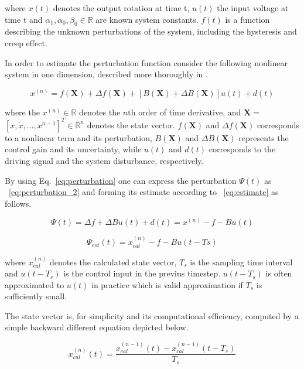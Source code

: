 where $x(t)$ denotes the output rotation at time t, $u(t)$ the input voltage at time t and $\alpha_1, \alpha_0, \beta_0 \in \mathbb{R}$ are known system constants. $f(t)$ is a function describing the unknown perturbations of the system, including the hysteresis and creep effect.

In order to estimate the perturbation function consider the following nonlinear system in one dimension, described more thoroughly in \cite{Elmali:1996}.

\begin{equation}
  \label{eq:perturbation}
  x^{(n)} = f(\mathbf{X}) + \Delta f(\mathbf{X}) + [B(\mathbf{X}) + \Delta B(\mathbf{X})]u(t) + d(t)
\end{equation}

where the $x^{(n)} \in \mathbb{R}$ denotes the $n$th order of time derivative, and $\mathbf{X} = $\\ $[x, \dot{x}, \hdots, x^{n-1}]^T\in \mathbb{R}^n$ denotes the state vector. $f(\mathbf{X})$ and $\Delta f(\mathbf{X})$ corresponds to a nonlinear term and its perturbation, $B(\mathbf{X})$ and $\Delta B(\mathbf{X})$
represents the control gain and its uncertainty, while $u(t)$ and $d(t)$ corresponds to the driving signal and the system disturbance, respectively.

By using Eq.~\eqref{eq:perturbation} one can express the perturbation $\Psi(t)$ as ~\eqref{eq:perturbation_2} and forming its estimate according to ~\eqref{eq:estimate} as follows.

\begin{equation}
  \label{eq:perturbation_2}
  \Psi(t) = \Delta f + \Delta Bu(t) + d(t) = x^{(n)} -f - Bu(t)
\end{equation}

\begin{equation}
  \label{eq:estimate}
  \Psi_{est}(t) = x_{cal}^{(n)} -f - Bu(t-Ts)
\end{equation}

where $x_{cal}^{(n)}$ denotes the calculated state vector, $T_s$ is the sampling time interval and $u(t-T_s)$ is the control input in the previus timestep. $u(t-T_s)$ is often approximated to $u(t)$ in practice which is valid approximation if $T_s$ is sufficiently small.

The state vector is, for simplicity and its computational efficiency, computed by a simple backward different equation depicted below.

\begin{equation}
  \label{eq:backward}
  x_{cal}^{(n)}(t) = \frac{x_{cal}^{(n-1)}(t) - x_{cal}^{(n-1)}(t-T_s)}{T_s}
\end{equation}

